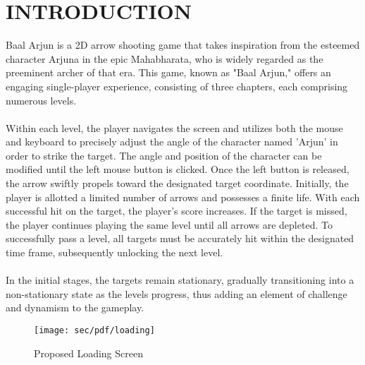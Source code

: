 \newpage

\section{INTRODUCTION}
Baal Arjun is a 2D arrow shooting game that takes inspiration from the esteemed character Arjuna in the epic Mahabharata, who is widely regarded as the preeminent archer of that era. This game, known as "Baal Arjun," offers an engaging single-player experience, consisting of three chapters, each comprising numerous levels.\\\\
Within each level, the player navigates the screen and utilizes both the mouse and keyboard to precisely adjust the angle of the character named 'Arjun' in order to strike the target. The angle and position of the character can be modified until the left mouse button is clicked. Once the left button is released, the arrow swiftly propels toward the designated target coordinate. Initially, the player is allotted a limited number of arrows and possesses a finite life. With each successful hit on the target, the player's score increases. If the target is missed, the player continues playing the same level until all arrows are depleted. To successfully pass a level, all targets must be accurately hit within the designated time frame, subsequently unlocking the next level.\\\\
In the initial stages, the targets remain stationary, gradually transitioning into a non-stationary state as the levels progress, thus adding an element of challenge and dynamism to the gameplay.
\\
\vspace{1.5 cm}
\begin{figure}[h]
	
	\centering
	\texttt{[image: sec/pdf/loading]}
	\caption{Proposed Loading Screen}
\end{figure}
